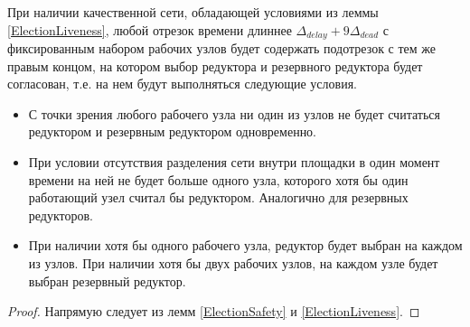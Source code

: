 \begin{theorem}
\label{ElectionEC}
    При наличии качественной сети, обладающей условиями из леммы \ref{ElectionLiveness}, любой отрезок времени длиннее $\Delta_{delay} + 9\Delta_{dead}$ с фиксированным набором рабочих узлов будет содержать подотрезок с тем же правым концом, на котором выбор редуктора и резервного редуктора будет согласован, т.е. на нем будут выполняться следующие условия.
    
    \begin{itemize}
        \item С точки зрения любого рабочего узла ни один из узлов не будет считаться редуктором и резервным редуктором одновременно.
    
        \item При условии отсутствия разделения сети внутри площадки в один момент времени на ней не будет больше одного узла, которого хотя бы один работающий узел считал бы редуктором. Аналогично для резервных редукторов.
        
        \item При наличии хотя бы одного рабочего узла, редуктор будет выбран на каждом из узлов. При наличии хотя бы двух рабочих узлов, на каждом узле будет выбран резервный редуктор.
    \end{itemize}
\end{theorem}
\begin{proof}
    Напрямую следует из лемм \ref{ElectionSafety} и \ref{ElectionLiveness}.
\end{proof}

